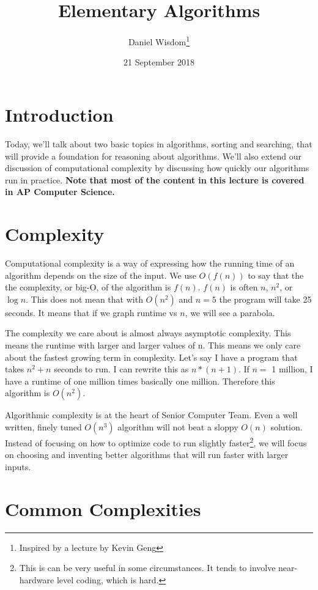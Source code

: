 \documentclass{article}
\title{Elementary Algorithms}
\author{Daniel Wisdom\footnote{Inspired by a lecture by Kevin Geng}}
\date{21 September 2018}
\begin{document}
\maketitle

\section{Introduction}

Today, we'll talk about two basic topics in algorithms, sorting and searching, that will provide a foundation for reasoning about algorithms. We'll also extend our discussion of computational complexity by discussing how quickly our algorithms run in practice. \textbf{Note that most of the content in this lecture is covered in AP Computer Science.}

\section{Complexity}

Computational complexity is a way of expressing how the running time of an algorithm depends on the size of the input.  We use $O(f(n))$ to say that the the complexity, or big-O, of the algorithm is $f(n)$.  $f(n)$ is often $n$, $n^2$, or $\log n$.  This does not mean that with $O(n^2)$ and $n=5$ the program will take 25 seconds.  It means that if we graph runtime vs $n$, we will see a parabola.

The complexity we care about is almost always asymptotic complexity.  This means the runtime with larger and larger values of n.  This means we only care about the fastest growing term in complexity.  Let's say I have a program that takes $n^2 + n$ seconds to run.  I can rewrite this as $n*(n+1)$.  If $n=$ 1 million, I have a runtime of one million times basically one million.  Therefore this algorithm is $O(n^2)$.

Algorithmic complexity is at the heart of Senior Computer Team.  Even a well written, finely tuned $O(n^3)$ algorithm will not beat a sloppy $O(n)$ solution.  Instead of focusing on how to optimize code to run slightly faster\footnote{This is can be very useful in some circumstances.  It tends to involve near-hardware level coding, which is hard.}, we will focus on choosing and inventing better algorithms that will run faster with larger inputs.


\section{Common Complexities}
\end{document}

